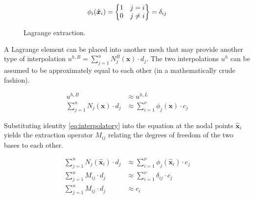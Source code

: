 \begin{equation}
\label{eq:interpolatory}
    \phi_i(\hat{\bm{x}}_i) =
    \left\{
    \begin{array}{@{}c@{}}
        1 ~~~ j=i \\
        0 ~~~ j \neq i
    \end{array} 
    \right\} 
    = \delta_{ij}
\end{equation}
    
\begin{figure}[h]
    \vspace{0.2cm}
    \begin{center}
    
    \caption{Lagrange extraction.} 
    \label{fig:lagrange_extraction}
    \end{center}
\end{figure}

A Lagrange element can be placed into another mesh that may provide another type of interpolation $u^{h,B} = \sum_{j=1}^{n} N_j^B(\bm{x}) \cdot d_j$. The two interpolations $u^{h}$ can be assumed to be approximately equal to each other (in a mathematically crude fashion).

\begin{equation}
\label{eq:approx}
\begin{split}
    u^{h,B} 
    &\approx u^{h,L} \\
    \sum_{j=1}^{n} N_j(\bm{x}) \cdot d_j 
    &\approx \sum_{i=1}^{\nu} \phi_j(\bm{x}) \cdot c_j
\end{split}
\end{equation}

Substituting identity \eqref{eq:interpolatory} into the equation at the nodal points $\hat{\bm{x}}_i$ yields the extraction operator $M_{ij}$ relating the degrees of freedom of the two bases to each other.

\begin{equation}
    \label{eq:derive_extraction_operator}
    \begin{split}
        \sum_{j=1}^{n} N_j(\hat{\bm{x}}_i) \cdot d_j 
        &\approx \sum_{i=1}^{\nu} \phi_j(\hat{\bm{x}}_i) \cdot c_j \\
        \sum_{j=1}^{n} M_{ij} \cdot d_j 
        &\approx \sum_{i=1}^{\nu} \delta_{ij} \cdot c_j \\
        \sum_{j=1}^{n} M_{ij} \cdot d_j 
        &\approx c_i \\
    \end{split}
\end{equation}

